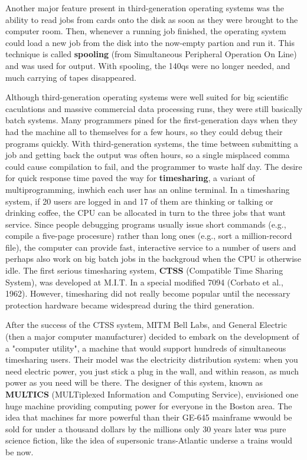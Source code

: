 \documentclass{book}
\newcommand {\kw}  [1] {\textbf{#1}}
\begin{document}
Another major feature present in third-generation operating systems was the ability to read jobs from cards onto the disk 
as soon as they were brought to the computer room.
Then, whenever a running job finished, the operating system could load a new job from the disk into the now-empty partion and run it.
This technique is called \kw{spooling} (from Simultaneous Peripheral Operation On Line) and was used for output.
With spooling, the 140qs were no longer needed, and much carrying of tapes disappeared.

Although third-generation operating systems were well suited for big scientific caculations and massive commercial data processing runs, 
they were still basically batch systems.
Many programmers pined for the first-generation days when they had the machine all to themselves for a few hours, 
so they could debug their programs quickly.
With third-generation systems, the time between submitting a job and getting back the output was often hours, 
so a single misplaced comma could cause compilation to fail, and the programmer to waste half day.
The desire for quick response time paved the way for \kw{timesharing}, a variant of multiprogramming, inwhich each user has an online terminal.
In a timesharing system, if 20 users are logged in and 17 of them are thinking or talking or drinking coffee, 
the CPU can be allocated in turn to the three jobs that want service.
Since people debugging programs usually issue short commands (e.g., compile a five-page procesure) 
rather than long ones (e.g., sort a million-record file), the computer can provide fast, 
interactive service to a number of users and perhaps also work on big batch jobs in the backgroud when the CPU is otherwise idle.
The first serious timesharing system, \kw{CTSS} (Compatible Time Sharing System), was developed at M.I.T.
In a special modified 7094 (Corbato et al., 1962). 
However, timesharing did not really become popular until the necessary protection hardware became widespread during the third generation. 

After the success of the CTSS system, MITM Bell Labs, and General Electric (then a major computer manufacturer) decided to embark on 
the development of a "computer utility", a machine that would support hundreds of simultaneous timesharing users.
Their model was the electricity distribution system:
when you need electric power, you just stick a plug in the wall, and within reason, as much power as you need will be there.
The designer of this system, known as \kw{MULTICS} (MULTiplexed Information and Computing Service), 
envisioned one huge machine providing computing power for everyone in the Boston area.
The idea that machines far more powerful than their GE-645 mainframe wwould be sold for under a thousand dollars by the millions only 30 years later 
was pure science fiction, like the idea of supersonic trans-Atlantic underse a trains would be now.
\end{document}
